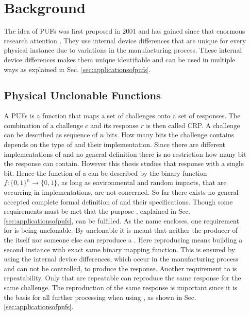 \chapter{Background}
\label{cap:background}

The idea of \acfp{PUF} was first proposed in 2001 and has gained since that enormous research attention \cite{Pappu2002PhysicalFunctions}. %
They use internal device differences that are unique for every physical instance due to variations in the manufacturing process.
These internal device differences makes them unique identifiable and can be used in multiple ways as explained in Sec. \ref{sec:applicationsofpufs}.


\section{Physical Unclonable Functions}
\label{sec:pyhsicalunclonablefunctions}

A \acfp{PUF} is a function that maps a set of challenges onto a set of responses.
The combination of a challenge $c$ and its response $r$ is then called \ac{CRP}.
A challenge can be described as sequence of $n$ bits.
How many bits the challenge contains depends on the type of \puf and their implementation.
Since there are different implementations of \pufs and no general definition there is no restriction how many bit the response can contain.
However this thesis studies \pufs that response with a single bit.
Hence the function of a \puf can be described by the binary function $f: \{0, 1\}^n \to \{0,1\}$, as long as environmental and random impacts, that are occurring in \puf implementations, are not concerned.
So far there exists no general accepted complete formal definition of \pufs and their specifications. %
Though some requirements must be met that the purpose \pufs, explained in Sec. \ref{sec:applicationsofpufs}, can be fulfilled.
As the name encloses, one requirement for \pufs is being unclonable. %
By unclonable it is meant that neither the producer of the \puf itself nor someone else can reproduce a \puf.
Here reproducing means building a second instance with exact same binary mapping function.
This is ensured by using the internal device differences, which occur in the manufacturing process and can not be controlled, to produce the \puf response.
Another requirement to \pufs is repeatability.
Only \pufs that are repeatable can reproduce the same response for the same challenge.
The reproduction of the same response is important since it is the basis for all further processing when using \pufs, as shown in Sec. \ref{sec:applicationsofpufs}. %


